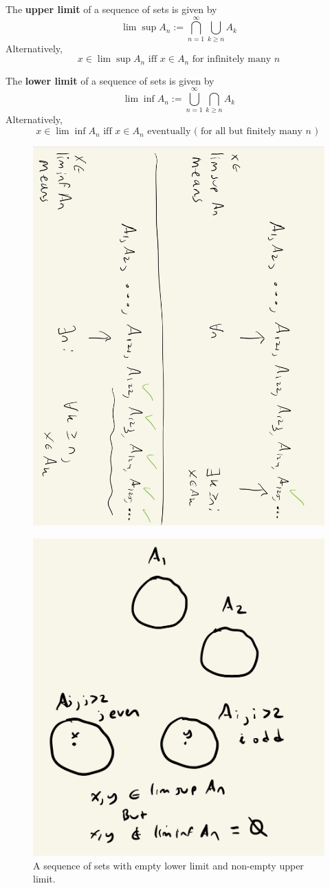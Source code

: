 \documentclass{article} %
\begin{document}
\begin{definition}
The \textbf{upper limit} of a sequence of sets is given by
\[ \lim\sup A_n := \bigcap_{n=1}^\infty \bigcup_{k \geq n} A_k \]
Alternatively,
\[ x \in \lim\sup A_n \text{ iff } x \in A_n \text{ for infinitely many } n \]
\label{def:upper_limit}
\end{definition}

\begin{definition}
The \textbf{lower limit} of a sequence of sets is given by
\[ \lim\inf A_n := \bigcup_{n=1}^\infty \bigcap_{k \geq n} A_k \]
Alternatively,
\[ x \in \lim\inf A_n \text{ iff } x \in A_n \text{ eventually ( for all but finitely many $n$ ) } \]
\end{definition}

\begin{figure}[H]
\centering 
\includegraphics[angle=90, width=.6\textwidth]{images/limsup_and_liminf_of_sets}
\end{figure}

\begin{example}{}

\begin{figure}[H]
\centering 
\includegraphics[width=.5\textwidth]{images/limsup_and_liminf_of_sets_example}
\caption{A sequence of sets with empty lower limit and non-empty upper limit.}
\end{figure}

\end{example}
\end{document}
